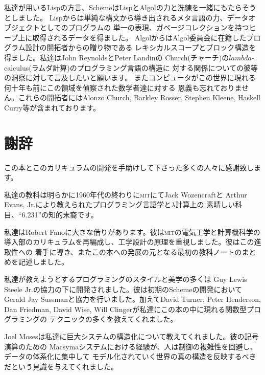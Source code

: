 \documentclass[oneside]{book}
\newcommand{\acronym}[1]{\textsc{\MakeLowercase{#1}}}
\begin{document}
私達が用いるLispの方言、SchemeはLispとAlgolの力と洗練を一緒にもたらそうとしました。
Lispからは単純な構文から導き出されるメタ言語の力、データオブジェクトとしてのプログラムの
単一の表現、ガベージコレクションを持つヒープ上に取得されるデータを得ました。
AlgolからはAlgol委員会に在籍したプログラム設計の開拓者からの贈り物である
レキシカルスコープとブロック構造を得ました。私達はJohn ReynoldsとPeter Landinの
Church(チャーチ)の\(lambda\)-calculus(ラムダ計算)のプログラミング言語の構造に
対する関係についての彼等の洞察に対して言及したいと願います。
またコンピュータがこの世界に現れる何十年も前にこの領域を偵察された数学者達に対する
恩義も忘れておりません。これらの開拓者にはAlonzo Church, Barkley Rosser, Stephen Kleene,
Haskell Curry等が含まれております。


\chapter*{謝辞}
\label{Acknowledgements}


この本とこのカリキュラムの開発を手助けして下さった多くの人々に感謝致します。



私達の教科は明らかに1960年代の終わりに\acronym{MIT}にてJack Wozencraftと
Arthur Evans, Jr.により教えられたプログラミング言語学と\( \lambda \)計算上の
素晴しい科目、``6.231''の知的末裔です。



私達はRobert Fanoに大きな借りがあります。彼は\acronym{MIT}の電気工学と計算機科学の
導入部のカリキュラムを再編成し、工学設計の原理を重視しました。彼はこの進取性への
着手に導き、またこの本への発展の元となる最初の教科ノートのまとめを記述しました。



私達が教えようとするプログラミングのスタイルと美学の多くは
Guy Lewis Steele Jr.の協力の下に開発されました。彼は初期のSchemeの開発において
Gerald Jay Sussmanと協力を行いました。加えてDavid Turner, Peter Henderson, 
Dan Friedman, David Wise, Will Clingerが私達にこの本の中に現れる関数型プログラミングの
テクニックの多くを教えてくれました。



Joel Mosesは私達に巨大システムの構造化について教えてくれました。彼の記号演算のための
Macsymaシステムにおける経験が、人は制御の複雑性を回避し、データの体系化に集中して
モデル化されていく世界の真の構造を反映するべきだという見識を与えてくれました。
\end{document}
